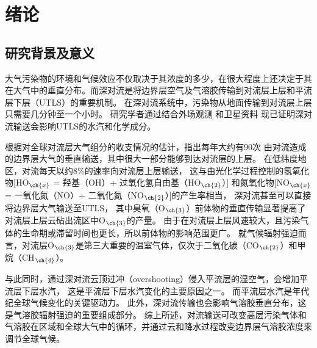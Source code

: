 
\chapter{绪论}

\section{研究背景及意义}

大气污染物的环境和气候效应不仅取决于其浓度的多少，在很大程度上还决定于其在大气中的垂直分布。而深对流是将边界层空气及气溶胶传输到对流层上层和平流层下层（UTLS）的重要机制\citep{Chatfield.1984,Dickerson.1987,Pickering.1989,Yin.2002}。
在深对流系统中，污染物从地面传输到对流层上层只需要几分钟至一个小时\citep{Skamarock.2000}。
研究学者通过结合外场观测\citep{Dickerson.1987,Pickering.1996,Bertram.2007,Apel.2012,Pan.2017}
和卫星资料\citep{Halland.2009,Barth.2012,Livesey.2013,Jensen.2015}
现已证明深对流输送会影响UTLS的水汽和化学成分。

根据对全球对流层大气组分的收支情况的估计，\citet{Cotton.1995}指出每年大约有90次
由对流造成的边界层大气的垂直输送，其中很大一部分能够到达对流层的上层。
在低纬度地区，对流每天以约8\%的速率向对流层上层输送，
这与由光化学过程控制的氢氧化物[HO$_{\ch{x}}$ = 羟基（OH）+ 过氧化氢自由基（HO$_{\ch{2}}$）]
和氮氧化物[NO$_{\ch{x}}$ = 一氧化氮（NO）+ 二氧化氮（NO$_{\ch{2}}$）]的产生率相当，
深对流甚至可以直接将边界层大气输送至UTLS\citep{Prather.1997}，
其中臭氧（O$_{\ch{3}}$）前体物的垂直传输显著提高了对流层上层云砧出流区中O$_{\ch{3}}$的产量\citep{Pickering.1990,Pickering.1992,Pickering.1992a}。
由于在对流层上层风速较大，且污染气体的生命期或滞留时间也更长，所以前体物的影响范围更广。
就气候辐射强迫而言，对流层O$_{\ch{3}}$是第三大重要的温室气体\citep{Myhre.2013}，仅次于二氧化碳（CO$_{\ch{2}}$）和甲烷（CH$_{\ch{4}}$）。

与此同时，通过深对流云顶过冲（overshooting）侵入平流层的湿空气，会增加平流层下层水汽\citep{Homeyer.2014}，
这是平流层下层水汽变化的主要原因之一。
而平流层水汽是年代纪全球气候变化的关键驱动力\citep{Solomon.2010}。 此外，深对流传输也会影响气溶胶垂直分布，这是气溶胶辐射强迫的重要组成部分\citep{Mishra.2012,Park.2015}。
综上所述，对流输送可改变高层污染气体和气溶胶在区域和全球大气中的循环\citep{Clarisse.2011}，并通过云和降水过程改变边界层气溶胶浓度来调节全球气候\citep{Taylor.1997}。

